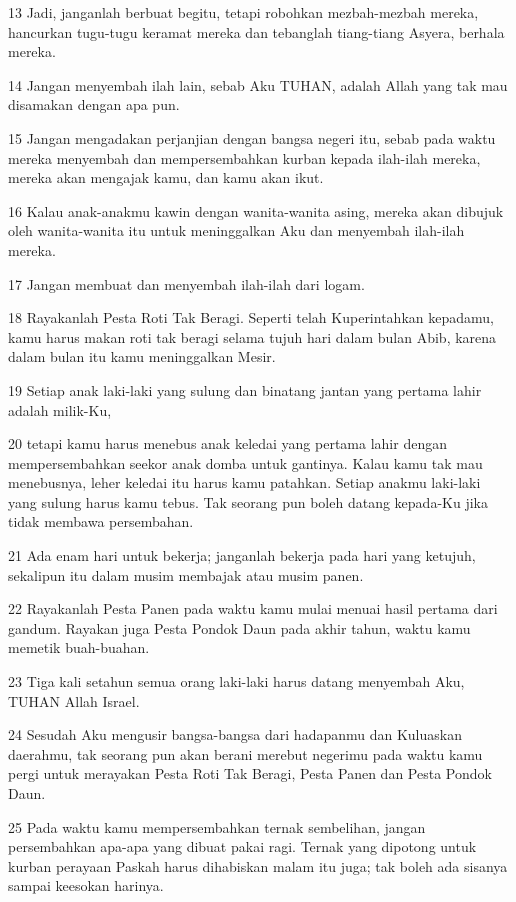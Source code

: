\par 13 Jadi, janganlah berbuat begitu, tetapi robohkan mezbah-mezbah mereka, hancurkan tugu-tugu keramat mereka dan tebanglah tiang-tiang Asyera, berhala mereka.
\par 14 Jangan menyembah ilah lain, sebab Aku TUHAN, adalah Allah yang tak mau disamakan dengan apa pun.
\par 15 Jangan mengadakan perjanjian dengan bangsa negeri itu, sebab pada waktu mereka menyembah dan mempersembahkan kurban kepada ilah-ilah mereka, mereka akan mengajak kamu, dan kamu akan ikut.
\par 16 Kalau anak-anakmu kawin dengan wanita-wanita asing, mereka akan dibujuk oleh wanita-wanita itu untuk meninggalkan Aku dan menyembah ilah-ilah mereka.
\par 17 Jangan membuat dan menyembah ilah-ilah dari logam.
\par 18 Rayakanlah Pesta Roti Tak Beragi. Seperti telah Kuperintahkan kepadamu, kamu harus makan roti tak beragi selama tujuh hari dalam bulan Abib, karena dalam bulan itu kamu meninggalkan Mesir.
\par 19 Setiap anak laki-laki yang sulung dan binatang jantan yang pertama lahir adalah milik-Ku,
\par 20 tetapi kamu harus menebus anak keledai yang pertama lahir dengan mempersembahkan seekor anak domba untuk gantinya. Kalau kamu tak mau menebusnya, leher keledai itu harus kamu patahkan. Setiap anakmu laki-laki yang sulung harus kamu tebus. Tak seorang pun boleh datang kepada-Ku jika tidak membawa persembahan.
\par 21 Ada enam hari untuk bekerja; janganlah bekerja pada hari yang ketujuh, sekalipun itu dalam musim membajak atau musim panen.
\par 22 Rayakanlah Pesta Panen pada waktu kamu mulai menuai hasil pertama dari gandum. Rayakan juga Pesta Pondok Daun pada akhir tahun, waktu kamu memetik buah-buahan.
\par 23 Tiga kali setahun semua orang laki-laki harus datang menyembah Aku, TUHAN Allah Israel.
\par 24 Sesudah Aku mengusir bangsa-bangsa dari hadapanmu dan Kuluaskan daerahmu, tak seorang pun akan berani merebut negerimu pada waktu kamu pergi untuk merayakan Pesta Roti Tak Beragi, Pesta Panen dan Pesta Pondok Daun.
\par 25 Pada waktu kamu mempersembahkan ternak sembelihan, jangan persembahkan apa-apa yang dibuat pakai ragi. Ternak yang dipotong untuk kurban perayaan Paskah harus dihabiskan malam itu juga; tak boleh ada sisanya sampai keesokan harinya.
